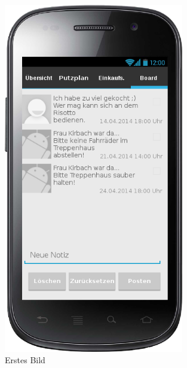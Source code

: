 \begin{figure}[htbp] 
  \centering
     \includegraphics[width=0.7\textwidth]{anhang/mockups/blackboard.png}
  \caption{Erstes Bild}
  \label{fig:Bild1}
\end{figure}

